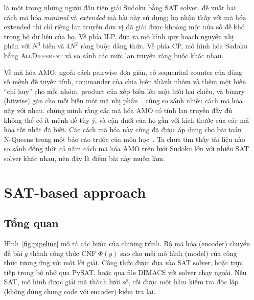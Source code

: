 \documentclass[a4paper,fleqn]{cas-sc}
\begin{document}
\citet{weber2005} là một trong những người đầu tiên giải Sudoku bằng SAT solver. \citet{lynce2006} đề xuất hai cách mã hóa \emph{minimal} và \emph{extended} mà bài này sử dụng; họ nhận thấy với mã hóa extended thì chỉ riêng lan truyền đơn vị đã giải được khoảng một nửa số đề khó trong bộ dữ liệu của họ. Về phía ILP, \citet{bartlett2008} đưa ra mô hình quy hoạch nguyên nhị phân với $N^3$ biến và $4N^2$ ràng buộc đẳng thức. Về phía CP, \citet{simonis2005} mô hình hóa Sudoku bằng \textsc{AllDifferent} và so sánh các mức lan truyền ràng buộc khác nhau.

Về mã hóa AMO, ngoài cách pairwise đơn giản, có sequential counter của \citet{sinz2005} dùng số mệnh đề tuyến tính, commander của \citet{klieber2007} chia biến thành nhóm và thêm một biến ``chỉ huy'' cho mỗi nhóm, product của \citet{chen2010} xếp biến lên một lưới hai chiều, và binary (bitwise) gán cho mỗi biến một mã nhị phân~\citep{frisch2010}. \citet{frisch2010} cũng so sánh nhiều cách mã hóa này với nhau. \citet{kucera2019} chứng minh rằng các mã hóa AMO có tính lan truyền đầy đủ không thể có ít mệnh đề tùy ý, và cận dưới của họ gần với kích thước của các mã hóa tốt nhất đã biết. Các cách mã hóa này cũng đã được áp dụng cho bài toán N-Queens trong một báo cáo trước của môn học~\citep{tran2024nqueens}. Ta chưa tìm thấy tài liệu nào so sánh đồng thời cả năm cách mã hóa AMO trên lưới Sudoku lớn với nhiều SAT solver khác nhau, nên đây là điểm bài này muốn làm.

\section{SAT-based approach}\label{sec:sat}

\subsection{Tổng quan}\label{sec:overview}

Hình~\ref{fig:pipeline} mô tả các bước của chương trình. Bộ mã hóa (encoder) chuyển đề bài $g$ thành công thức CNF $\Phi(g)$ sao cho mỗi mô hình (model) của công thức tương ứng với một lời giải. Công thức được đưa vào SAT solver, hoặc trực tiếp trong bộ nhớ qua PySAT, hoặc qua file DIMACS với solver chạy ngoài. Nếu SAT, mô hình được giải mã thành lưới số, rồi được một hàm kiểm tra độc lập (không dùng chung code với encoder) kiểm tra lại.
\end{document}
